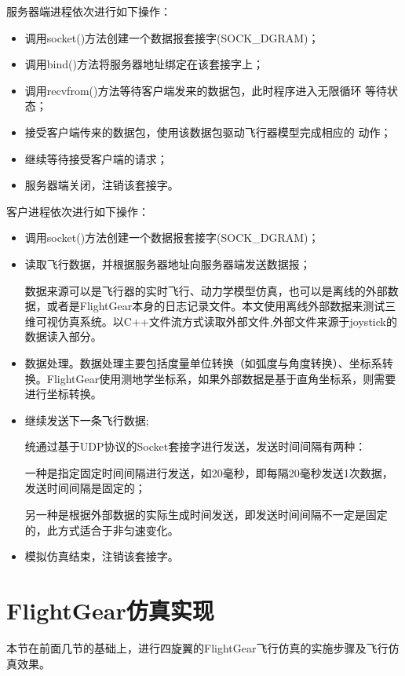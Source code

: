 服务器端进程依次进行如下操作：
\begin{itemize}
  \item 调用socket()方法创建一个数据报套接字(SOCK\_DGRAM)；
  \item 调用bind()方法将服务器地址绑定在该套接字上；
  \item 调用recvfrom()方法等待客户端发来的数据包，此时程序进入无限循环
等待状态；
  \item 接受客户端传来的数据包，使用该数据包驱动飞行器模型完成相应的
动作；
  \item 继续等待接受客户端的请求；
  \item 服务器端关闭，注销该套接字。
\end{itemize}
客户进程依次进行如下操作：
\begin{itemize}
  \item 调用socket()方法创建一个数据报套接字(SOCK\_DGRAM)；
  \item 读取飞行数据，并根据服务器地址向服务器端发送数据报；

数据来源可以是飞行器的实时飞行、动力学模型仿真，也可以是离线的外部数据，或者是FlightGear本身的日志记录文件。本文使用离线外部数据来测试三维可视仿真系统。以C++文件流方式读取外部文件,外部文件来源于joystick的数据读入部分。
\item 数据处理。数据处理主要包括度量单位转换（如弧度与角度转换）、坐标系转换。FlightGear使用测地学坐标系，如果外部数据是基于直角坐标系，则需要进行坐标转换。
\item 继续发送下一条飞行数据;

统通过基于UDP协议的Socket套接字进行发送，发送时间间隔有两种：

一种是指定固定时间间隔进行发送，如20毫秒，即每隔20毫秒发送1次数据，发送时间间隔是固定的；

另一种是根据外部数据的实际生成时间发送，即发送时间间隔不一定是固定的，此方式适合于非匀速变化。
\item 模拟仿真结束，注销该套接字。
\end{itemize}
\section{FlightGear仿真实现}
本节在前面几节的基础上，进行四旋翼的FlightGear飞行仿真的实施步骤及飞行仿真效果。
